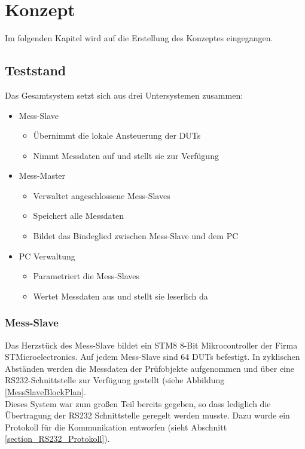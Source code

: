 \chapter{Konzept}
\label{chapter_Konzept}

Im folgenden Kapitel wird auf die Erstellung des Konzeptes eingegangen.

\section{Teststand}
\label{section_Teststand}

Das Gesamtsystem setzt sich aus drei Untersystemen zusammen:

\begin{itemize}

\item Mess-Slave
\begin{itemize}
\item Übernimmt die lokale Ansteuerung der \acp{DUT}
\item Nimmt Messdaten auf und stellt sie zur Verfügung
\end{itemize}

\item Mess-Master
\begin{itemize}
\item Verwaltet angeschlossene Mess-Slaves
\item Speichert alle Messdaten
\item Bildet das Bindeglied zwischen Mess-Slave und dem PC
\end{itemize}

\item PC Verwaltung
\begin{itemize}
\item Parametriert die Mess-Slaves
\item Wertet Messdaten aus und stellt sie leserlich da
\end{itemize}

\end{itemize}
\subsection{Mess-Slave}
\label{section_Mess-Slave}

Das Herzstück des Mess-Slave bildet ein STM8  8-Bit Mikrocontroller der Firma STMicroelectronics.
Auf jedem Mess-Slave sind 64 \acp{DUT} befestigt. In zyklischen Abständen werden die Messdaten der Prüfobjekte aufgenommen und über eine RS232-Schnittstelle zur Verfügung gestellt (siehe Abbildung \ref{MessSlaveBlockPlan}.\\
Dieses System war zum großen Teil bereits gegeben, so dass lediglich die Übertragung der RS232 Schnittstelle geregelt werden musste. Dazu wurde ein Protokoll für die Kommunikation entworfen (sieht Abschnitt \ref{section_RS232_Protokoll}).
\\



